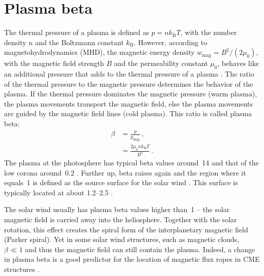 \section{Plasma beta}
\label{sec:plasma_beta}
The thermal pressure of a plasma is defined as $p = n k_\text{B} T$, with the number density $n$ and the Boltzmann constant $k_\text{B}$. However, according to magnetohydrodynamics (MHD), the magnetic energy density $w_\text{mag} = B^2 / (2 \mu_0)$, with the magnetic field strength $B$ and the permeability constant $\mu_0$, behaves like an additional pressure that adds to the thermal pressure of a plasma \citep[p.~50]{Kivelson1995}. The ratio of the thermal pressure to the magnetic pressure determines the behavior of the plasma. If the thermal pressure dominates the magnetic pressure (warm plasma), the plasma movements transport the magnetic field, else the plasma movements are guided by the magnetic field lines (cold plasma). This ratio is called plasma beta:
\begin{align}
	\beta &= \frac{p}{p_\text{mag}}	\,,\\
	&= \frac{2 \mu_0 n k_\text{B} T}{B^2}	\,.	\nonumber
\end{align}
The plasma at the photosphere has typical beta values around~14 and that of the low corona around~0.2 \citep{Gary2001}. Further up, beta raises again and the region where it equals~1 is defined as the source surface for the solar wind \citep{Schatten1969}.	%
This surface is typically located at about \SIrange{1.2}{2.5}{\Rs} \citep{Gary2001}.

The solar wind usually has plasma beta values higher than~1 -- the solar magnetic field is carried away into the heliosphere. Together with the solar rotation, this effect creates the spiral form of the interplanetary magnetic field (Parker spiral). Yet in some solar wind structures, such as magnetic clouds, $\beta \ll 1$ and thus the magnetic field can still contain the plasma. Indeed, a change in plasma beta is a good predictor for the location of magnetic flux ropes in CME structures \citep{Riley2013,Savani2013}.



